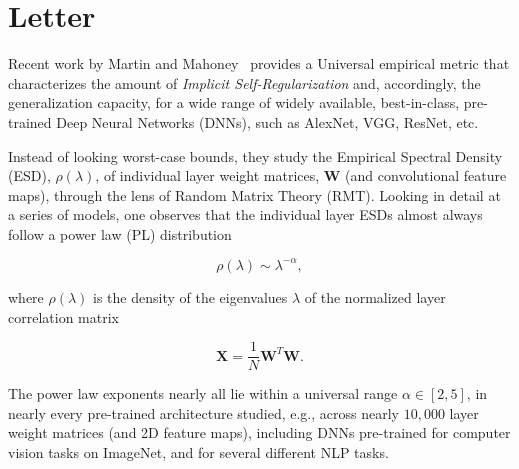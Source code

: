 \vspace{-2mm}
\section{Letter}
\label{sxn:body}
\vspace{-1mm}

Recent work by Martin and Mahoney~\cite{MM18_TR} provides a Universal empirical metric that characterizes the amount of \emph{Implicit Self-Regularization} and, accordingly, 
the generalization capacity, for a wide range of widely available, best-in-class, pre-trained Deep Neural Networks (DNNs), such as AlexNet, VGG, ResNet, etc.   

Instead of looking worst-case bounds, they study the Empirical Spectral Density (ESD), $\rho(\lambda)$, of individual layer weight matrices, $\mathbf{W}$ (and convolutional feature maps), 
through the lens of Random Matrix Theory (RMT).  Looking in detail at a series of models, one observes that the individual layer ESDs  almost always follow a power law (PL) distribution

\begin{equation}
\rho(\lambda)\sim\lambda^{-\alpha}  ,
\label{eqn:eigenval_pl}
\end{equation}

where $\rho(\lambda)$ is the density of the eigenvalues $\lambda$ of the normalized layer correlation matrix 

\begin{equation}
 \mathbf{X} = \frac{1}{N}\mathbf{W}^{T}\mathbf{W}.
\end{equation}

The power law exponents nearly all lie within a universal range $\alpha\in[2,5]$,  in nearly every pre-trained architecture studied, e.g., across nearly $10,000$ layer
 weight matrices (and 2D feature maps), including DNNs pre-trained for computer vision tasks on ImageNet, and for several different NLP tasks.

